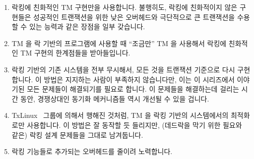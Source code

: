 \begin{enumerate}
\item	락킹에 친화적인 TM 구현만을 사용합니다.
	불행히도, 락킹에 친화적이지 않은 구현들은 성공적인 트랜잭션을 위한 낮은
	오버헤드와 극단적으로 큰 트랜잭션을 수용할 수 있는 능력과 같은 장점을
	일부 갖습니다.
\item	TM 을 락 기반의 프로그램에 사용할 때 ``조금만'' TM 을 사용해서 락킹에
	친화적인 TM 구현의 한계점들을 받아들입니다.
\item	락킹 기반의 기존 시스템을 전부 무시해서, 모든 것을 트랜잭션 기준으로
	다시 구현합니다.
	이 방법은 지지하는 사람이 부족하지 않습니다만, 이는 이 시리즈에서
	이야기된 모든 문제들이 해결되기를 필요로 합니다.
	이 문제들을 해결하는데 걸리는 시간 동안, 경쟁상대인 동기화 메커니즘들
	역시 개선될 수 있을 겁니다.
\item	TxLinux~\cite{ChistopherJRossbach2007a} 그룹에 의해서 행해진 것처럼, TM
	을 락킹 기반의 시스템에서의 최적화로만 사용합니다.
	이 방법은 잘 동작할 듯 들리지만, (데드락을 막기 위한 필요와 같은) 락킹
	설계 문제들을 그대로 남겨둡니다.
\item	락킹 기능들로 추가되는 오버헤드를 줄이려 노력합니다.

\end{enumerate}


